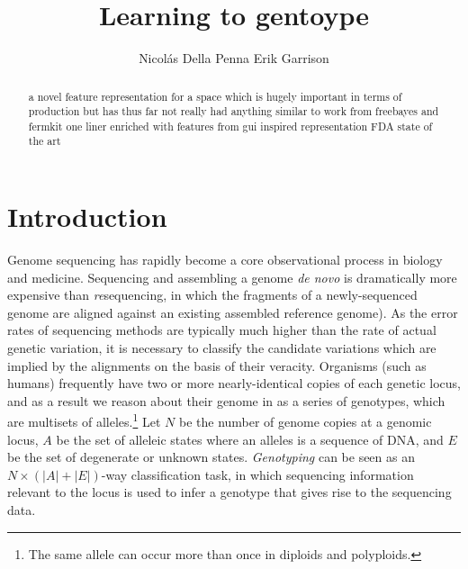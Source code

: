 \documentclass{article}
\title{Learning to gentoype}
\author{
Nicol\'as Della Penna
\And
Erik Garrison \\
} %
\begin{document}

\maketitle

\begin{abstract}
a novel feature representation
for a space which is hugely important in terms of production
but has thus far not really had anything similar to work from
freebayes and fermkit one liner
enriched with features from gui inspired representation
FDA state of the art
\end{abstract}

\section{Introduction}



Genome sequencing has rapidly become a core observational process in biology and medicine.
Sequencing and assembling a genome \emph{de novo} is dramatically more expensive than \emph{re}sequencing, in which the fragments of a newly-sequenced genome are aligned against an existing assembled reference genome).
As the error rates of sequencing methods are typically much higher than the rate of actual genetic variation, it is necessary to classify the candidate variations which are implied by the alignments on the basis of their veracity.
Organisms (such as humans) frequently have two or more nearly-identical copies of each genetic locus, and as a result we reason about their genome in as a series of genotypes, which are multisets of alleles.\footnote{The same allele can occur more than once in diploids and polyploids.} 
Let $N$ be the number of genome copies at a genomic locus, $A$ be the set of alleleic states where an alleles is a sequence of DNA, and $E$ be the set of degenerate or unknown states.
\emph{Genotyping} can be seen as an $N \times ( |A| + |E| )$-way classification task, in which sequencing information relevant to the locus is used to infer a genotype that gives rise to the sequencing data.
\end{document}
